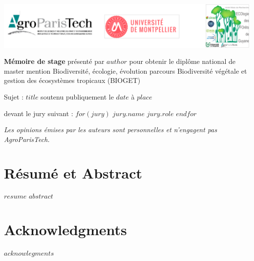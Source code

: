 \documentclass[$if(fontsize)$$fontsize$,$endif$$if(lang)$$babel-lang$,$endif$$if(papersize)$$papersize$,$endif$$for(classoption)$$classoption$$sep$,$endfor$]{article}
\date{}
\makeatletter
\def\maxwidth{\ifdim\Gin@nat@width>\linewidth\linewidth
\else\Gin@nat@width\fi}
\let\Oldincludegraphics\includegraphics
\renewcommand{\includegraphics}[1]{\Oldincludegraphics[width=\maxwidth]{#1}}
\let\oldsection\section
\renewcommand\section{\newpage\oldsection}
\makeatother
\begin{document}
\includegraphics{logos}
\begin{center}
\LARGE{\textbf{Mémoire de stage}}
\newline
\newline
\large{présenté par}
\newline
\large{$author$}
\newline
\newline
\large{pour obtenir le diplôme national de master}
\newline
\large{mention Biodiversité, écologie, évolution}
\newline
\small{parcours Biodiversité végétale et gestion des écosystèmes tropicaux (BIOGET)}

\vspace*{\fill}
\large{Sujet :}
\newline
\Large{\textbf{$title$ }}
\newline
\newline
\large{soutenu publiquement le $date$ à $place$}

\vspace*{\fill}
\large{devant le jury suivant :}
\newline
\newline
$for(jury)$
\large{$jury.name$  $jury.role$}
\newline
$endfor$
\end{center}
\newpage

\vspace*{\fill}
\emph{Les opinions émises par les auteurs sont personnelles et n'engagent pas AgroParisTech.}
\newpage

\section{Résumé et Abstract}
$resume$
\newline
\newline
$abstract$

\section{Acknowledgments}
$acknowlegments$

\tableofcontents
\end{document}
